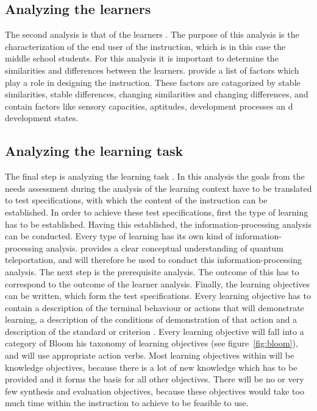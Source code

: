 \documentclass[12pt]{report} %
\begin{document}
\subsection{Analyzing the learners}

The second analysis is that of the learners \cite{smithragan}. The purpose of this analysis is the characterization of the end user of the instruction, which is in this case the middle school students. For this analysis it is important to determine the similarities and differences between the learners.  provide a list of factors which play a role in designing the instruction. These factors are catagorized by stable similarities, stable differences, changing similarities and changing differences, and contain factors like sensory capacities, aptitudes, development processes an d development states.

\subsection{Analyzing the learning task}

The final step is analyzing the learning task \cite{smithragan}. In this analysis the goals from the needs assessment during the analysis of the learning context have to be translated to test specifications, with which the content of the instruction can be established. In order to achieve these test specifications, first the type of learning has to be established. Having this established, the information-processing analysis can be conducted. Every type of learning has its own kind of information-processing analysis.  provides a clear conceptual understanding of quantum teleportation, and will therefore be used to conduct this information-processing analysis. The next step is the prerequisite analysis. The outcome of this has to correspond to the outcome of the learner analysis. Finally, the learning objectives can be written, which form the test specifications. Every learning objective has to contain a description of the terminal behaviour or actions that will demonstrate learning, a description of the conditions of demonstration of that action and a description of the standard or criterion \cite{smithragan}. Every learning objective will fall into a category of Bloom his taxonomy of learning objectives \cite{bloom} (see figure~\ref{fig:bloom}), and will use appropriate action verbs. Most learning objectives within will be knowledge objectives, because there is a lot of new knowledge which has to be provided and it forms the basis for all other objectives. There will be no or very few synthesis and evaluation objectives, because these objectives would take too much time within the instruction to achieve to be feasible to use.
\end{document}

